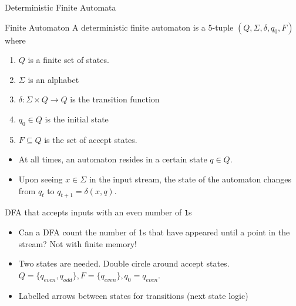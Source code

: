 \documentclass{beamer}
\begin{document}
\begin{frame}{Deterministic Finite Automata}
\begin{block}{Finite Automaton}
A deterministic finite automaton is a 5-tuple \( (Q, \Sigma, \delta, q_0, F) \) where
    \begin{enumerate}
        \item \(Q\) is a finite set of states.
        \item \(\Sigma\) is an alphabet
        \item \(\delta: \Sigma \times Q \rightarrow Q\) is the transition function
        \item \(q_0 \in Q\) is the initial state
        \item \( F \subseteq Q\) is the set of accept states.
    \end{enumerate}
    \end{block}
\pause
\begin{itemize}
    \item At all times, an automaton resides in a certain state \(q \in Q\).
    \item Upon seeing \(x \in \Sigma\) in the input stream, the state of the automaton changes from \(q_t\) to \( q_{t+1} = \delta(x, q)\).
\end{itemize}
\end{frame}
\begin{frame}{DFA that accepts inputs with an even number of \texttt{1}s}
\pause
\begin{itemize}
    \item Can a DFA count the number of 1s that have appeared until a point in the stream? Not with finite memory!
    \pause
    \item Two states are needed. Double circle around accept states. \\ \(Q = \{q_{even}, q_{odd} \}, F = \{q_{even}\}, q_0 = q_{even}\). \\
    \pause
    \item Labelled arrows between states for transitions (next state logic) \\
\end{itemize}
\end{frame}
\end{document}

